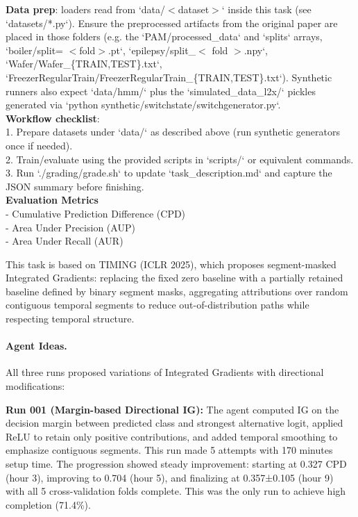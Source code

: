 \documentclass[11pt]{article}
\theoremstyle{plain}
\theoremstyle{definition}
\theoremstyle{remark}
\begin{document}
\begin{tcolorbox}
\textbf{Data prep}: loaders read from `data/$<$dataset$>$` inside this task (see `datasets/*.py`). Ensure the
preprocessed artifacts from the original paper are placed in those folders (e.g. the `PAM/processed\_data`
and `splits` arrays, `boiler/split= $<$fold$>$.pt`, `epilepsy/split\_$<$ fold $>$.npy`, `Wafer/Wafer\_\{TRAIN,TEST\}.txt`,
`FreezerRegularTrain/FreezerRegularTrain\_\{TRAIN,TEST\}.txt`). Synthetic runners also expect `data/hmm/`
plus the `simulated\_data\_l2x/` pickles generated via `python synthetic/switchstate/switchgenerator.py`.\\

\textbf{Workflow checklist}:\\
1. Prepare datasets under `data/` as described above (run synthetic generators once if needed).\\
2. Train/evaluate using the provided scripts in `scripts/` or equivalent commands.\\
3. Run `./grading/grade.sh` to update `task\_description.md` and capture the JSON summary before finishing.\\

\textbf{Evaluation Metrics}\\
- Cumulative Prediction Difference (CPD)\\
- Area Under Precision (AUP)\\
- Area Under Recall (AUR)\\


\end{tcolorbox}

This task is based on TIMING (ICLR 2025), which proposes segment-masked Integrated Gradients: replacing the fixed zero baseline with a partially retained baseline defined by binary segment masks, aggregating attributions over random contiguous temporal segments to reduce out-of-distribution paths while respecting temporal structure.

\paragraph{Agent Ideas.} All three runs proposed variations of Integrated Gradients with directional modifications:

\textbf{Run 001 (Margin-based Directional IG):} The agent computed IG on the decision margin between predicted class and strongest alternative logit, applied ReLU to retain only positive contributions, and added temporal smoothing to emphasize contiguous segments. This run made 5 attempts with 170 minutes setup time. The progression showed steady improvement: starting at 0.327 CPD (hour 3), improving to 0.704 (hour 5), and finalizing at 0.357±0.105 (hour 9) with all 5 cross-validation folds complete. This was the only run to achieve high completion (71.4\%).
\end{document}
